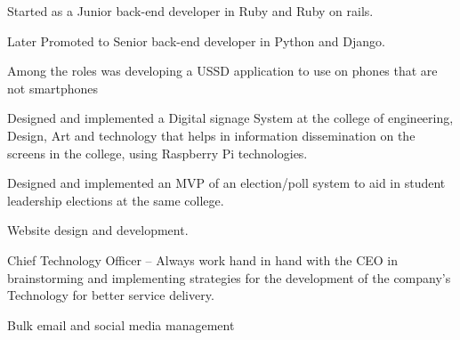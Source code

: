 \documentclass[]{plushcv}
\begin{document}
\sectionsep
\sectionsep


\begin{tightemize}
\item Started as a Junior back-end developer in Ruby and Ruby on rails.
\item Later Promoted to Senior back-end developer in Python and Django. \item Among the roles was developing a USSD application to use on phones that are not smartphones
\end{tightemize}

\sectionsep
\sectionsep


\begin{tightemize}
\item Designed and implemented a Digital signage System at the college of engineering, Design, Art and technology that helps in information dissemination on the screens in the college, using Raspberry Pi technologies.
\item Designed and implemented an MVP of an election/poll system to aid in student leadership elections at the same college.
\item Website design and development.
\end{tightemize}
\sectionsep
\sectionsep


\begin{tightemize}
\item Chief Technology Officer – Always work hand in hand with the CEO in brainstorming and implementing strategies for the development of the company's Technology for better service delivery.
\item Bulk email and social media management
\end{tightemize}

\sectionsep
\sectionsep

\end{document}
